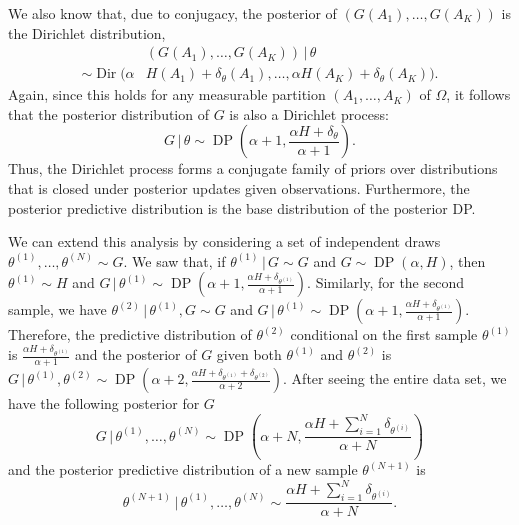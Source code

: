 \documentclass[final,3p,times,twocolumn]{elsarticle}
\DeclareMathOperator*{\Dir}{Dir}
\DeclareMathOperator*{\DP}{DP}
\begin{document}
We also know that, due to conjugacy, the posterior of $(G(A_1),\dots,G(A_K))$ is the Dirichlet distribution,
\begin{equation}
\label{eqn:dppost1}
\begin{split}
&(G(A_1),\dots,G(A_K))\,|\,\theta \\
\sim \Dir(\alpha &H(A_1) + \delta_\theta (A_1), \dots, \alpha H(A_K) + \delta_\theta (A_K)).
\end{split}
\end{equation}
Again, since this holds for any measurable partition $(A_1,\dots,A_K)$ of $\Omega$, it follows that the posterior distribution of $G$ is also a Dirichlet process:
\begin{equation}
\label{eqn:dppost2}
G\,|\,\theta \sim \DP\left(\alpha + 1, \frac{\alpha H + \delta_\theta}{\alpha + 1}\right).
\end{equation}
Thus, the Dirichlet process forms a conjugate family of priors over distributions that is closed under posterior updates given observations.
Furthermore, the posterior predictive distribution is the base distribution of the posterior DP.

We can extend this analysis by considering a set of independent draws $\theta^{(1)},\dots,\theta^{(N)} \sim G$.
We saw that, if $\theta^{(1)}\,|\,G \sim G$ and $G \sim \DP\left(\alpha,H\right)$, then $\theta^{(1)} \sim H$ and $G\,|\,\theta^{(1)} \sim \DP\left(\alpha+1,\frac{\alpha H + \delta_{\theta^{(1)}}}{\alpha+1}\right)$.
Similarly, for the second sample, we have $\theta^{(2)}\,|\,\theta^{(1)},G \sim G$ and $G\,|\,\theta^{(1)} \sim \DP\left(\alpha+1,\frac{\alpha H + \delta_{\theta^{(1)}}}{\alpha+1}\right)$.
Therefore, the predictive distribution of $\theta^{(2)}$ conditional on the first sample $\theta^{(1)}$ is $\frac{\alpha H + \delta_{\theta^{(1)}}}{\alpha+1}$ and the posterior of $G$ given both $\theta^{(1)}$ and $\theta^{(2)}$ is $G\,|\,\theta^{(1)},\theta^{(2)} \sim \DP\left(\alpha+2,\frac{\alpha H + \delta_{\theta^{(1)}}+\delta_{\theta^{(2)}}}{\alpha+2}\right)$.
After seeing the entire data set, we have the following posterior for $G$
\begin{equation}
G\,|\,\theta^{(1)},\dots,\theta^{(N)} \sim \DP\left(\alpha+N,\frac{\alpha H + \sum_{i=1}^N \delta_{\theta^{(i)}}}{\alpha+N}\right)
\end{equation}
and the posterior predictive distribution of a new sample $\theta^{(N+1)}$ is 
\begin{equation}
\label{eqn:dppostpred}
\theta^{(N+1)}\,|\,\theta^{(1)},\dots,\theta^{(N)} \sim \frac{\alpha H + \sum_{i=1}^N \delta_{\theta^{(i)}}}{\alpha+N}.
\end{equation}
\end{document}
